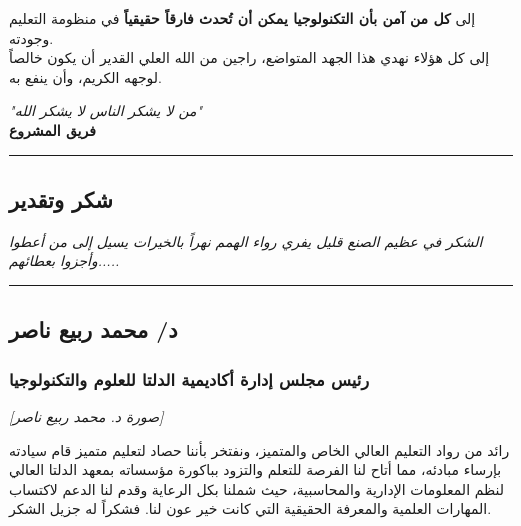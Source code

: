 \documentclass[12pt, a4paper]{report}
\begin{document}
إلى \textbf{كل من آمن بأن التكنولوجيا يمكن أن تُحدث فارقاً حقيقياً} في منظومة التعليم وجودته. \\

إلى كل هؤلاء نهدي هذا الجهد المتواضع، راجين من الله العلي القدير أن يكون خالصاً لوجهه الكريم، وأن ينفع به. \\

\begin{center}

\textit{"من لا يشكر الناس لا يشكر الله"} \\

\textbf{فريق المشروع} \\

\end{center}

\vspace{0.5cm}\hrule\vspace{0.5cm}
\newpage

\begin{center}

\chapter*{شكر وتقدير}

\textit{الشكر في عظيم الصنع قليل يفري رواء الهمم نهراً بالخيرات يسيل إلى من أعطوا وأجزوا بعطائهم.....} \\

\vspace{0.5cm}\hrule\vspace{0.5cm}

\section*{د/ محمد ربيع ناصر}
\subsection*{رئيس مجلس إدارة أكاديمية الدلتا للعلوم والتكنولوجيا}

\textit{[صورة د. محمد ربيع ناصر]} \\

\end{center}

رائد من رواد التعليم العالي الخاص والمتميز، ونفتخر بأننا حصاد لتعليم متميز قام سيادته بإرساء مبادئه، مما أتاح لنا الفرصة للتعلم والتزود بباكورة مؤسساته بمعهد الدلتا العالي لنظم المعلومات الإدارية والمحاسبية، حيث شملنا بكل الرعاية وقدم لنا الدعم لاكتساب المهارات العلمية والمعرفة الحقيقية التي كانت خير عون لنا. فشكراً له جزيل الشكر. \\
\end{document}
